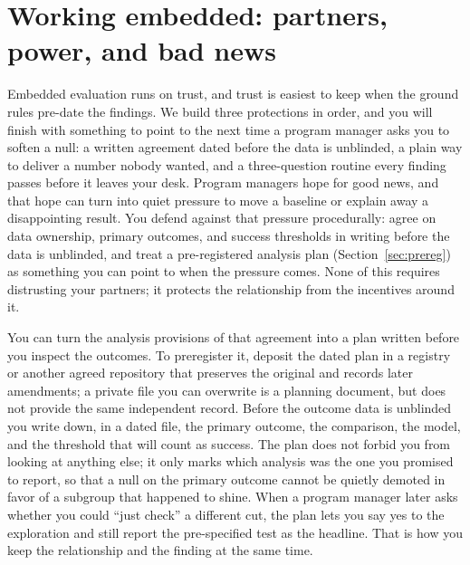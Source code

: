 \section{Working embedded: partners, power, and bad news}\label{sec:literacy}
Embedded evaluation runs on trust, and trust is easiest to keep when the ground rules pre-date the findings. We build three protections in order, and you will finish with something to point to the next time a program manager asks you to soften a null: a written agreement dated before the data is unblinded, a plain way to deliver a number nobody wanted, and a three-question routine every finding passes before it leaves your desk. Program managers hope for good news, and that hope can turn into quiet pressure to move a baseline or explain away a disappointing result. You defend against that pressure procedurally: agree on data ownership, primary outcomes, and success thresholds in writing before the data is unblinded, and treat a pre-registered analysis plan (Section~\ref{sec:prereg}) as something you can point to when the pressure comes. None of this requires distrusting your partners; it protects the relationship from the incentives around it.

You can turn the analysis provisions of that agreement into a plan written before you inspect the outcomes. To preregister it, deposit the dated plan in a registry or another agreed repository that preserves the original and records later amendments; a private file you can overwrite is a planning document, but does not provide the same independent record. Before the outcome data is unblinded you write down, in a dated file, the primary outcome, the comparison, the model, and the threshold that will count as success. The plan does not forbid you from looking at anything else; it only marks which analysis was the one you promised to report, so that a null on the primary outcome cannot be quietly demoted in favor of a subgroup that happened to shine. When a program manager later asks whether you could \enquote{just check} a different cut, the plan lets you say yes to the exploration and still report the pre-specified test as the headline. That is how you keep the relationship and the finding at the same time.

